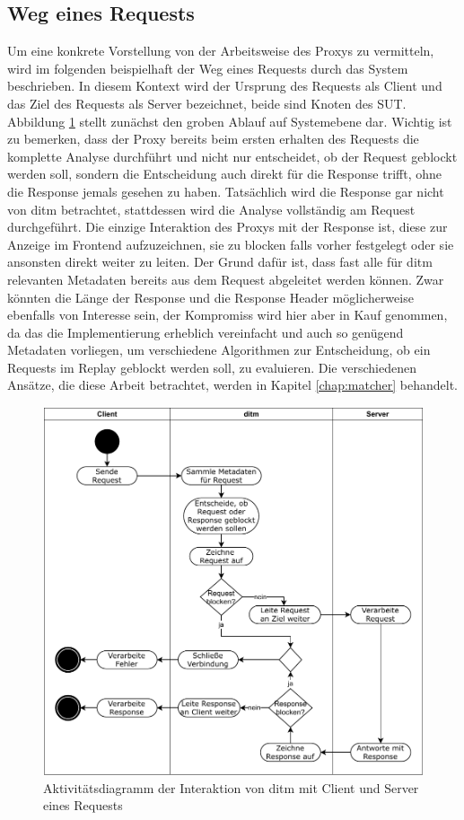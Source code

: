 \documentclass[12pt,a4paper]{report}
\begin{document}
\subsection{Weg eines Requests}
Um eine konkrete Vorstellung von der Arbeitsweise des Proxys zu vermitteln, wird im folgenden beispielhaft der Weg eines
Requests durch das System beschrieben. In diesem Kontext wird der Ursprung des Requests als Client und das Ziel des
Requests als Server bezeichnet, beide sind Knoten des SUT. Abbildung \ref{fig:activity} stellt zunächst den groben Ablauf auf Systemebene dar.
Wichtig ist zu bemerken, dass der Proxy bereits beim ersten erhalten des Requests die komplette Analyse durchführt und
nicht nur entscheidet, ob der Request geblockt werden soll, sondern die Entscheidung auch direkt für die Response trifft,
ohne die Response jemals gesehen zu haben. Tatsächlich wird die Response gar nicht von ditm betrachtet, stattdessen wird
die Analyse vollständig am Request durchgeführt. Die einzige Interaktion des Proxys mit der Response ist, diese zur Anzeige im
Frontend aufzuzeichnen, sie zu blocken falls vorher festgelegt oder sie ansonsten direkt weiter zu leiten.
Der Grund dafür ist, dass fast alle für ditm relevanten Metadaten bereits aus dem Request abgeleitet werden können. Zwar
könnten die Länge der Response und die Response Header möglicherweise ebenfalls von Interesse sein, der Kompromiss wird
hier aber in Kauf genommen, da das die Implementierung erheblich vereinfacht und auch so genügend Metadaten vorliegen,
um verschiedene Algorithmen zur Entscheidung, ob ein Requests im Replay geblockt werden soll, zu evaluieren.
Die verschiedenen Ansätze, die diese Arbeit betrachtet, werden in Kapitel \ref{chap:matcher} behandelt.
\begin{figure}[H]
	\centering
	\includegraphics[width=\linewidth]{img/ditm-Activity.pdf}
	\caption{Aktivitätsdiagramm der Interaktion von ditm mit Client und Server eines Requests}
	\label{fig:activity}
\end{figure}
\end{document}
